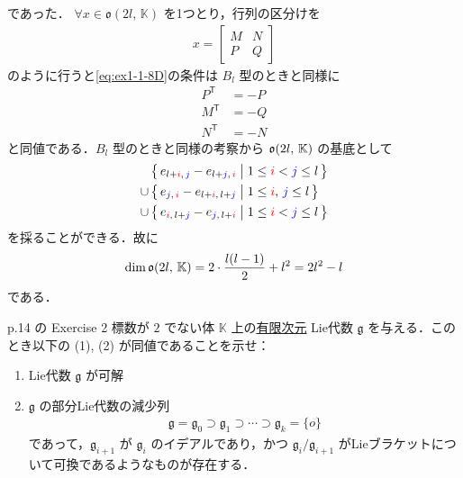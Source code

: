 \documentclass{ltjsarticle}
\theoremstyle{mystyle} %
\numberwithin{equation}{section}
\begin{document}
\begin{description}
    であった．
    $\forall x \in \mathfrak{o} (2l,\, \mathbb{K})$ を1つとり，行列の区分けを
    \begin{align}
        x = \left[
            \begin{array}{cc}
                M & N \\  
                P & Q 
            \end{array}
        \right]
    \end{align}
    のように行うと\eqref{eq:ex1-1-8D}の条件は $B_l$ 型のときと同様に
    \begin{align}
        P^{\mathsf{T}} &= -P  \\
        M^{\mathsf{T}} &= -Q \\
        N^{\mathsf{T}} &= -N
    \end{align}
    と同値である．$B_l$ 型のときと同様の考察から $\mathfrak{o} (2l,\, \mathbb{K})$ の基底として
    \begin{align}
        &\bigl\{\, e_{l + \textcolor{red}{i},\, \textcolor{blue}{j}} - e_{l + \textcolor{blue}{j},\, \textcolor{red}{i}} \bigm| 1 \le \textcolor{red}{i} < \textcolor{blue}{j} \le l \,\bigr\} \\
        \cup\, &\bigl\{\, e_{\textcolor{blue}{j},\, \textcolor{red}{i}} - e_{l + \textcolor{red}{i},\, l + \textcolor{blue}{j}} \bigm| 1 \le \textcolor{red}{i},\, \textcolor{blue}{j} \le l \,\bigr\}  \\
        \cup\, &\bigl\{\, e_{\textcolor{red}{i},\, l + \textcolor{blue}{j}} - e_{\textcolor{blue}{j},\, l + \textcolor{red}{i}} \bigm| 1 \le \textcolor{red}{i} < \textcolor{blue}{j} \le l \,\bigr\} 
    \end{align}
    を採ることができる．故に
    \begin{align}
        \dim \mathfrak{o} (2l,\, \mathbb{K}) = 2 \cdot \frac{l (l-1)}{2} + l^2 = 2l^2 - l
    \end{align}
    である．
\end{description}

\setcounter{section}{3}

\begin{myproblem}[label=ex:1-3-8]{p.14 の Exercise 2}
    標数が $2$ でない体 $\mathbb{K}$ 上の\underline{有限次元} Lie代数 $\mathfrak{g}$ を与える．このとき以下の (1), (2) が同値であることを示せ：
    \begin{enumerate}
        \item Lie代数 $\mathfrak{g}$ が可解 
        \item $\mathfrak{g}$ の部分Lie代数の減少列
        \begin{align}
            \mathfrak{g} = \mathfrak{g}_0 \supset \mathfrak{g}_1 \supset \cdots \supset \mathfrak{g}_k = \{o\}
        \end{align}
        であって，$\mathfrak{g}_{i+1}$ が $\mathfrak{g}_i$ のイデアルであり，かつ $\mathfrak{g}_i / \mathfrak{g}_{i+1}$ がLieブラケットについて可換であるようなものが存在する．
    \end{enumerate}
\end{myproblem}
\end{document}
